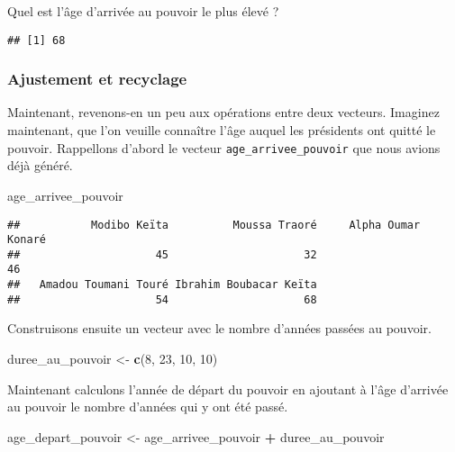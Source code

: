 \documentclass[]{book}
\newenvironment{Shaded}{\begin{snugshade}}{\end{snugshade}}
\newcommand{\KeywordTok}[1]{\textcolor[rgb]{0.13,0.29,0.53}{\textbf{#1}}}
\newcommand{\DecValTok}[1]{\textcolor[rgb]{0.00,0.00,0.81}{#1}}
\newcommand{\StringTok}[1]{\textcolor[rgb]{0.31,0.60,0.02}{#1}}
\newcommand{\OperatorTok}[1]{\textcolor[rgb]{0.81,0.36,0.00}{\textbf{#1}}}
\newcommand{\NormalTok}[1]{#1}
\begin{document}
Quel est l'âge d'arrivée au pouvoir le plus élevé ?

\begin{verbatim}
## [1] 68
\end{verbatim}

\subsubsection{Ajustement et recyclage}\label{ajustement-et-recyclage}

Maintenant, revenons-en un peu aux opérations entre deux vecteurs.
Imaginez maintenant, que l'on veuille connaître l'âge auquel les
présidents ont quitté le pouvoir. Rappellons d'abord le vecteur
\texttt{age\_arrivee\_pouvoir} que nous avions déjà généré.

\begin{Shaded}
\begin{Highlighting}[]
\NormalTok{age_arrivee_pouvoir}
\end{Highlighting}
\end{Shaded}

\begin{verbatim}
##           Modibo Keïta          Moussa Traoré     Alpha Oumar Konaré 
##                     45                     32                     46 
##   Amadou Toumani Touré Ibrahim Boubacar Keïta 
##                     54                     68
\end{verbatim}

Construisons ensuite un vecteur avec le nombre d'années passées au
pouvoir.

\begin{Shaded}
\begin{Highlighting}[]
\NormalTok{duree_au_pouvoir <-}\StringTok{ }\KeywordTok{c}\NormalTok{(}\DecValTok{8}\NormalTok{, }\DecValTok{23}\NormalTok{, }\DecValTok{10}\NormalTok{, }\DecValTok{10}\NormalTok{)}
\end{Highlighting}
\end{Shaded}

Maintenant calculons l'année de départ du pouvoir en ajoutant à l'âge
d'arrivée au pouvoir le nombre d'années qui y ont été passé.

\begin{Shaded}
\begin{Highlighting}[]
\NormalTok{age_depart_pouvoir <-}\StringTok{ }\NormalTok{age_arrivee_pouvoir }\OperatorTok{+}\StringTok{ }\NormalTok{duree_au_pouvoir}
\end{Highlighting}
\end{Shaded}
\end{document}
